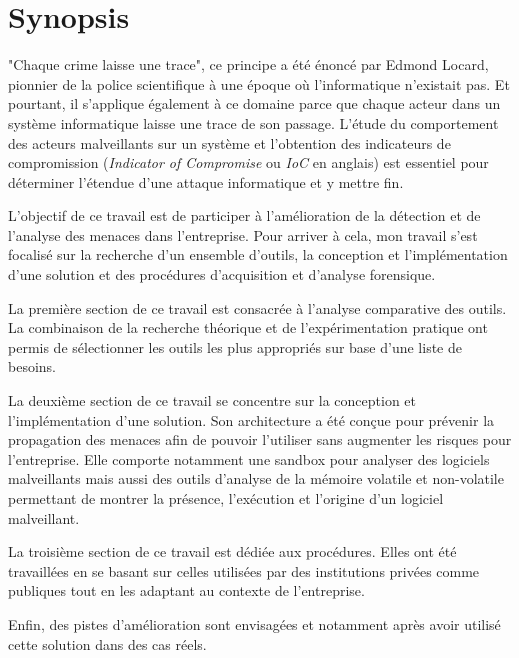 
\chapter*{Synopsis} 

"Chaque crime laisse une trace", ce principe a été énoncé par Edmond Locard, pionnier de la police scientifique à une époque où l'informatique n'existait pas. Et pourtant, il s'applique également à ce domaine parce que chaque acteur dans un système informatique laisse une trace de son passage. L'étude du comportement des acteurs malveillants sur un système et l'obtention des indicateurs de compromission (\textit{Indicator of Compromise} ou \textit{IoC} en anglais) est essentiel pour déterminer l'étendue d'une attaque informatique et y mettre fin.

L'objectif de ce travail est de participer à l'amélioration de la détection et de l'analyse des menaces dans l'entreprise. Pour arriver à cela, mon travail s'est focalisé sur la recherche d'un ensemble d'outils, la conception et l'implémentation d'une solution et des procédures d'acquisition et d'analyse forensique.

La première section de ce travail est consacrée à l'analyse comparative des outils. La combinaison de la recherche théorique et de l'expérimentation pratique ont permis de sélectionner les outils les plus appropriés sur base d'une liste de besoins.

La deuxième section de ce travail se concentre sur la conception et l'implémentation d'une solution. Son architecture a été conçue pour prévenir la propagation des menaces afin de pouvoir l'utiliser sans augmenter les risques pour l'entreprise. Elle comporte notamment une sandbox pour analyser des logiciels malveillants mais aussi des outils d'analyse de la mémoire volatile et non-volatile permettant de montrer la présence, l'exécution et l'origine d'un logiciel malveillant.

La troisième section de ce travail est dédiée aux procédures. Elles ont été travaillées en se basant sur celles utilisées par des institutions privées comme publiques tout en les adaptant au contexte de l'entreprise.

Enfin, des pistes d'amélioration sont envisagées et notamment après avoir utilisé cette solution dans des cas réels.


